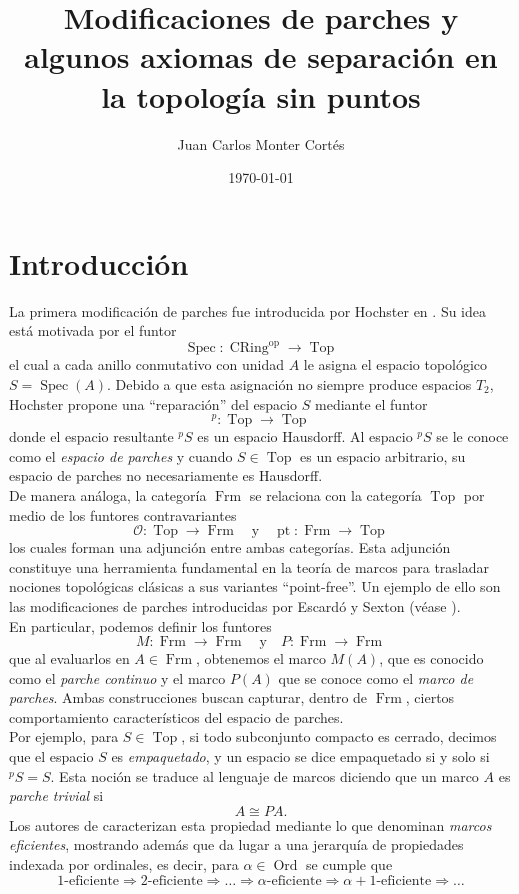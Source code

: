 \documentclass{protocol_template}
\title{Modificaciones de parches y algunos axiomas de separación en la topología sin puntos}
\author{Juan Carlos Monter Cortés}
\date{\today}
\DeclareMathOperator{\Frm}{Frm}
\DeclareMathOperator{\CRing}{CRing}
\DeclareMathOperator{\Ord}{Ord}
\DeclareMathOperator{\Top}{Top}
\DeclareMathOperator{\Spec}{Spec}
\DeclareMathOperator{\pt}{pt}
\DeclareMathOperator{\op}{op}
\begin{document}
\makefrontpage


\section{Introducción}
La primera modificación de parches fue introducida por Hochster en \cite{hochster1969prime}. Su idea está motivada por el funtor 
\[
\Spec\colon \CRing^{\op}\to \Top
\]
el cual a cada anillo conmutativo con unidad $A$ le asigna el espacio topológico $S=\Spec(A)$. Debido a que esta asignación no siempre produce espacios $T_2$,
Hochster propone una ``reparación'' del espacio $S$ mediante el funtor 
\[
^p\colon \Top\to \Top
\]
donde el espacio resultante $^pS$ es un espacio Hausdorff. Al espacio $^pS$ se le conoce como el \emph{espacio de parches} y cuando $S\in \Top$ es un espacio arbitrario, su espacio de parches 
no necesariamente es Hausdorff.\\

De manera análoga, la categoría $\Frm$ se relaciona con la categoría $\Top$ por medio de los funtores contravariantes
\[
\mathcal{O}\colon \Top\to \Frm\quad \text{y}\quad \pt\colon \Frm\to \Top
\]
los cuales forman una adjunción entre ambas categorías. Esta adjunción constituye una herramienta fundamental en la teoría de marcos para trasladar nociones
topológicas clásicas a sus variantes ``point-free''. Un ejemplo de ello son las modificaciones de parches introducidas por Escardó y Sexton (véase \cite{escardo2001regular,sexton2006point}).\\

En particular, podemos definir los funtores 
\[
M\colon \Frm\to \Frm\quad \text{y}\quad P\colon \Frm\to \Frm 
\]
que al evaluarlos en $A\in \Frm$, obtenemos el marco $M(A)$, que es conocido como el \emph{parche continuo} y el marco $P(A)$ que se conoce como el \emph{marco de parches}. 
Ambas construcciones buscan capturar, dentro de $\Frm$, ciertos comportamiento característicos 
del espacio de parches.\\

Por ejemplo, para $S\in \Top$, si todo subconjunto compacto es cerrado, decimos que el espacio $S$ es \emph{empaquetado}, y un espacio se dice empaquetado si y solo si $^pS=S$.
Esta noción se traduce al lenguaje de marcos diciendo que un marco $A$ es \emph{parche trivial} si
\[
A\cong PA.
\]
Los autores de \cite{sexton2006point,sexton2006ordinal,sexton2003point} caracterizan esta propiedad mediante lo que denominan \emph{marcos eficientes},
mostrando además que da lugar a una jerarquía de propiedades indexada por ordinales, es decir, para $\alpha\in \Ord$
se cumple que 
\[
1\text{-eficiente}\Rightarrow 2\text{-eficiente}\Rightarrow \dots \Rightarrow \alpha\text{-eficiente}\Rightarrow \alpha +1\text{-eficiente}\Rightarrow \dots
\]
\end{document}
